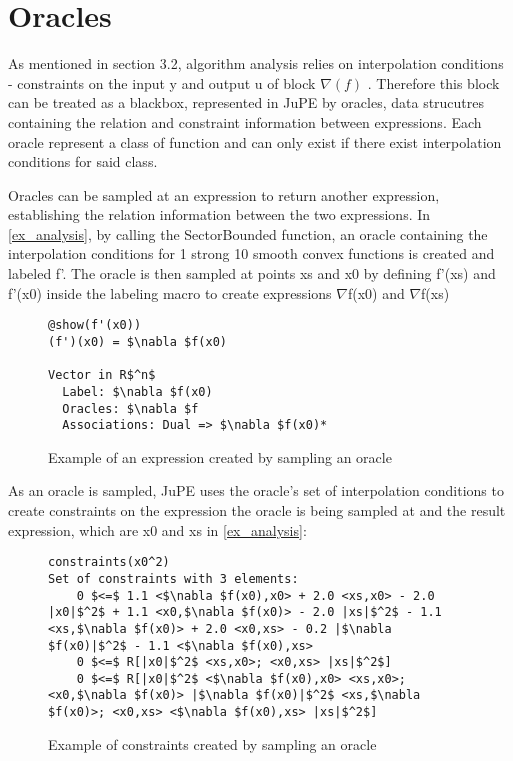 \section{Oracles}
As mentioned in section 3.2, algorithm analysis relies on interpolation conditions - constraints on the input y and output u  of block \( \nabla (f) \) . Therefore this block can be treated as a blackbox,  represented in JuPE by oracles, data strucutres containing the relation and constraint information between expressions. Each oracle represent a class of function and can only exist if there exist interpolation conditions for said class.

Oracles can be sampled at an expression to return another expression, establishing the relation information between the two expressions.  In \ref{ex_analysis}, by calling the SectorBounded function, an oracle containing the interpolation conditions for 1 strong 10 smooth convex functions is created and labeled f'. The oracle is then sampled at points xs and x0 by defining f'(xs) and f'(x0) inside the labeling macro to create expressions $\nabla $f(x0) and $\nabla $f(xs)

\begin{figure}[!h]
	\begin{lstlisting}[mathescape]
@show(f'(x0))
(f')(x0) = $\nabla $f(x0)

Vector in R$^n$
  Label: $\nabla $f(x0)
  Oracles: $\nabla $f
  Associations: Dual => $\nabla $f(x0)*

\end{lstlisting}
\caption{Example of an expression created by sampling an oracle}
\label{ex_sampling}
\end{figure}

As an oracle is sampled, JuPE uses the oracle's set of interpolation conditions to create constraints on the expression the oracle is being sampled at and the result expression, which are x0 and xs in \ref{ex_analysis}:

\begin{figure}[!h]
	\begin{lstlisting}[mathescape]
constraints(x0^2)
Set of constraints with 3 elements:
	0 $<=$ 1.1 <$\nabla $f(x0),x0> + 2.0 <xs,x0> - 2.0 |x0|$^2$ + 1.1 <x0,$\nabla $f(x0)> - 2.0 |xs|$^2$ - 1.1 <xs,$\nabla $f(x0)> + 2.0 <x0,xs> - 0.2 |$\nabla $f(x0)|$^2$ - 1.1 <$\nabla $f(x0),xs>
	0 $<=$ R[|x0|$^2$ <xs,x0>; <x0,xs> |xs|$^2$]
	0 $<=$ R[|x0|$^2$ <$\nabla $f(x0),x0> <xs,x0>; <x0,$\nabla $f(x0)> |$\nabla $f(x0)|$^2$ <xs,$\nabla $f(x0)>; <x0,xs> <$\nabla $f(x0),xs> |xs|$^2$]
	\end{lstlisting}
	\caption{Example of constraints created by sampling an oracle }
	\label{ex_orc_constraints}
\end{figure}

